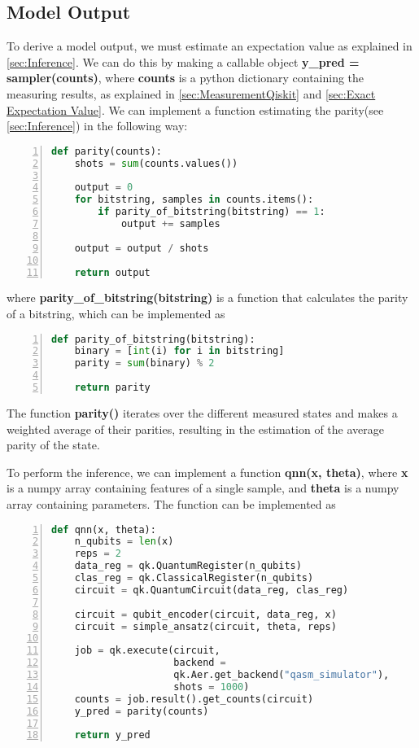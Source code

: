 \subsection{Model Output}\label{sec:InferenceImplementation}
To derive a model output, we must estimate an expectation value as explained in \autoref{sec:Inference}. We can do this by making a callable object \textbf{y\_pred = sampler(counts)}, where \textbf{counts} is a python dictionary containing the measuring results, as explained in \autoref{sec:MeasurementQiskit} and \autoref{sec:Exact Expectation Value}. We can implement a function estimating the parity(see \autoref{sec:Inference}) in the following way:

\begin{lstlisting}[language=python, numbers=left]
def parity(counts):
    shots = sum(counts.values())
    
    output = 0
    for bitstring, samples in counts.items():
        if parity_of_bitstring(bitstring) == 1:
            output += samples

    output = output / shots

    return output
\end{lstlisting}
where \textbf{parity\_of\_bitstring(bitstring)} is a function that calculates the parity of a bitstring, which can be implemented as 
\begin{lstlisting}[language=python, numbers=left]
def parity_of_bitstring(bitstring):
    binary = [int(i) for i in bitstring]
    parity = sum(binary) % 2
    
    return parity
\end{lstlisting}

The function \textbf{parity()} iterates over the different measured states and makes a weighted average of their parities, resulting in the estimation of the average parity of the state.

To perform the inference, we can implement a function \textbf{qnn(x, theta)}, where \textbf{x} is a numpy array containing features of a single sample, and \textbf{theta} is a numpy array containing parameters. The function can be implemented as 

\begin{lstlisting}[language=python, numbers=left]
def qnn(x, theta):
    n_qubits = len(x)
    reps = 2
    data_reg = qk.QuantumRegister(n_qubits)
    clas_reg = qk.ClassicalRegister(n_qubits)
    circuit = qk.QuantumCircuit(data_reg, clas_reg)
    
    circuit = qubit_encoder(circuit, data_reg, x)
    circuit = simple_ansatz(circuit, theta, reps)

    job = qk.execute(circuit, 
                     backend = 
                     qk.Aer.get_backend("qasm_simulator"),
                     shots = 1000)
    counts = job.result().get_counts(circuit)
    y_pred = parity(counts)
    
    return y_pred
\end{lstlisting}


